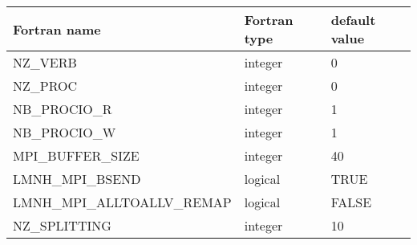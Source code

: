 \begin{center}
\begin{tabular} {|l|l|l|}
\hline
Fortran name & Fortran type & default value \\
\hline
NZ\_VERB & integer & 0 \\
NZ\_PROC & integer & 0 \\
NB\_PROCIO\_R & integer & 1 \\
NB\_PROCIO\_W & integer & 1 \\
MPI\_BUFFER\_SIZE & integer & 40 \\
LMNH\_MPI\_BSEND  & logical & TRUE \\
LMNH\_MPI\_ALLTOALLV\_REMAP & logical & FALSE \\
NZ\_SPLITTING & integer & 10 \\
\hline
\end{tabular}
\end{center}

